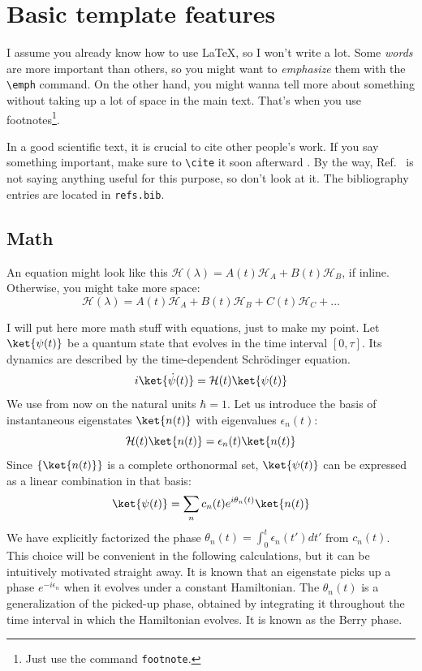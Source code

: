 
\chapter{Basic template features}\label{ch:feats}

I assume you already know how to use \LaTeX, so I won't write a lot.
Some \emph{words} are more important than others, so you might want to \emph{emphasize} them with the \verb|\emph| command.
On the other hand, you might wanna tell more about something without taking up a lot of space in the main text.
That's when you use footnotes\footnote{Just use the command \texttt{footnote}.}.

In a good scientific text, it is crucial to cite other people's work. If you say something important, make sure to \verb|\cite| it soon afterward \cite{10.1088/1367-2630/ad313e}. By the way, Ref.~\cite{10.1088/1367-2630/ad313e} is not saying anything useful for this purpose, so don't look at it. The bibliography entries are located in \texttt{refs.bib}.




\section{Math}

An equation might look like this $\mathcal{H}(\lambda) = A(t)\mathcal{H}_{A} + B(t)\mathcal{H}_{B}$, if inline. 
Otherwise, you might take more space:
\begin{equation*}
    \mathcal{H}(\lambda) = A(t)\mathcal{H}_{A} + B(t)\mathcal{H}_{B} + C(t)\mathcal{H}_{C} + ...
\end{equation*}

I will put here more math stuff with equations, just to make my point. Let $\ket{\psi(t)}$ be a quantum state that evolves in the time interval $[0,\tau]$. Its dynamics are described by the time-dependent Schrödinger equation.
$$i\ket{\dot\psi(t)} = \mathcal{H}(t)\ket{\psi(t)}$$
We use from now on the natural units $\hbar=1$. Let us introduce the basis of instantaneous eigenstates $\ket{n(t)}$ with eigenvalues $\epsilon_n(t)$:
\begin{equation}
    \label{eq:adth-eigenvalue}
    \mathcal{H}(t)\ket{n(t)} = \epsilon_n(t) \ket{n(t)}
\end{equation}
Since $\{\ket{n(t)}\}$ is a complete orthonormal set, $\ket{\psi(t)}$ can be expressed as a linear combination in that basis:
\begin{equation}
    \ket{\psi(t)} = \sum_n c_n(t) e^{i\theta_n(t)} \ket{n(t)}
\end{equation}
We have explicitly factorized the phase $\theta_n(t)=\int_0^t \epsilon_n(t')dt'$ from $c_n(t)$. This choice will be convenient in the following calculations, but it can be intuitively motivated straight away. 
It is known that an eigenstate picks up a phase $e^{-i\epsilon_n}$ when it evolves under a constant Hamiltonian. The $\theta_n(t)$ is a generalization of the picked-up phase, obtained by integrating it throughout the time interval in which the Hamiltonian evolves. It is known as the Berry phase.\\


